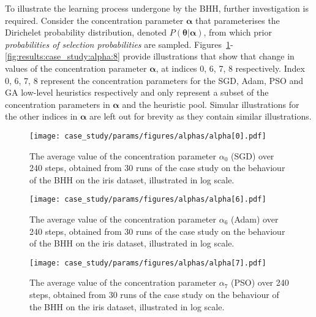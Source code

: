 To illustrate the learning process undergone by the \acs{BHH}, further investigation is required. Consider the concentration parameter $\boldsymbol{\alpha}$ that parameterises the Dirichelet probability distribution, denoted $P(\boldsymbol{\theta} \vert \boldsymbol{\alpha})$, from which prior \textit{probabilities of selection probabilities} are sampled. Figures~\ref{fig:results:case_study:alpha:0}-\ref{fig:results:case_study:alpha:8} provide illustrations that show that change in values of the concentration parameter $\boldsymbol{\alpha}$, at indices 0, 6, 7, 8 respectively. Index 0, 6, 7, 8 represent the concentration parameters for the \acs{SGD}, \acs{Adam}, \acs{PSO} and \acs{GA} low-level heuristics respectively and only represent a subset of the concentration parameters in $\boldsymbol{\alpha}$ and the heuristic pool. Simular illustrations for the other indices in $\boldsymbol{\alpha}$ are left out for brevity as they contain similar illustrations.

\begin{figure}[htpb]
	\centering
	\texttt{[image: case\_study/params/figures/alphas/alpha[0].pdf]}
	\caption{The average value of the concentration parameter $\alpha_{0}$ (\acs{SGD}) over 240 steps, obtained from 30 runs of the case study on the behaviour of the \acs{BHH} on the iris dataset, illustrated in log scale.}
	\label{fig:results:case_study:alpha:0}
\end{figure}

\begin{figure}[htpb]
	\centering
	\texttt{[image: case\_study/params/figures/alphas/alpha[6].pdf]}
	\caption{The average value of the concentration parameter $\alpha_{6}$ (\acs{Adam}) over 240 steps, obtained from 30 runs of the case study on the behaviour of the \acs{BHH} on the iris dataset, illustrated in log scale.}
	\label{fig:results:case_study:alpha:6}
\end{figure}

\begin{figure}[htpb]
	\centering
	\texttt{[image: case\_study/params/figures/alphas/alpha[7].pdf]}
	\caption{The average value of the concentration parameter $\alpha_{7}$ (\acs{PSO}) over 240 steps, obtained from 30 runs of the case study on the behaviour of the \acs{BHH} on the iris dataset, illustrated in log scale.}
	\label{fig:results:case_study:alpha:7}
\end{figure}

